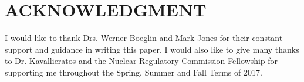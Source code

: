 \documentclass[letterpaper, 12 pt, conference]{ieeeconf}  %
\begin{document}






\section*{ACKNOWLEDGMENT}
I would like to thank Drs. Werner Boeglin and Mark Jones for their constant support and guidance in writing this
paper. I would also like to give many thanks to Dr. Kavallieratos and the Nuclear Regulatory Commission Fellowship for supporting me throughout the Spring, Summer and Fall Terms of 2017.   







\newpage
\onecolumn


\end{document}
